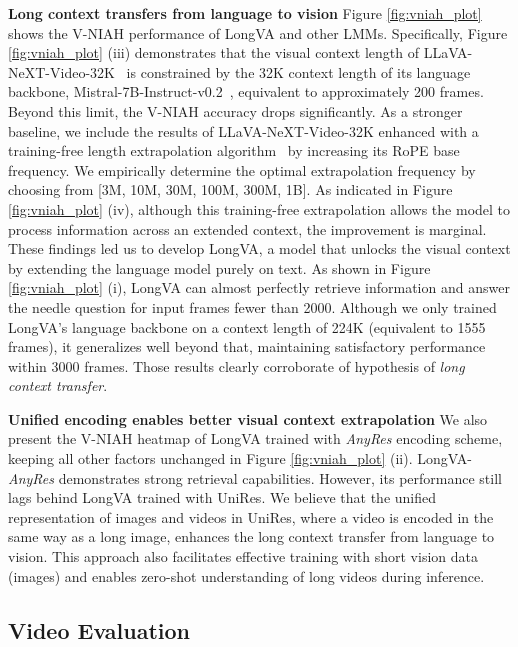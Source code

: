 \textbf{Long context transfers from language to vision} Figure \ref{fig:vniah_plot} shows the V-NIAH performance of LongVA and other LMMs. Specifically, Figure \ref{fig:vniah_plot} (iii) demonstrates that the visual context length of LLaVA-NeXT-Video-32K~\citep{zhang2024llavanextvideo} is constrained by the 32K context length of its language backbone, Mistral-7B-Instruct-v0.2~\citep{jiang2023mistral}, equivalent to approximately 200 frames. Beyond this limit, the V-NIAH accuracy drops significantly.  As a stronger baseline, we include the results of LLaVA-NeXT-Video-32K enhanced with a training-free length extrapolation algorithm~\citep{ntk_rope} by increasing its RoPE base frequency. We empirically determine the optimal extrapolation frequency by choosing from [3M, 10M, 30M, 100M, 300M, 1B]. As indicated in Figure \ref{fig:vniah_plot} (iv), although this training-free extrapolation allows the model to process information across an extended context, the improvement is marginal.  These findings led us to develop LongVA, a model that unlocks the visual context by extending the language model purely on text.  As shown in Figure \ref{fig:vniah_plot} (i), LongVA can almost perfectly retrieve information and answer the needle question for input frames fewer than 2000. Although we only trained LongVA's language backbone on a context length of 224K (equivalent to 1555 frames), it generalizes well beyond that, maintaining satisfactory performance within 3000 frames. Those results clearly corroborate of hypothesis of \textit{long context transfer}.

\textbf{Unified encoding enables better visual context extrapolation}
We also present the V-NIAH heatmap of LongVA trained with \textit{AnyRes} encoding scheme, keeping all other factors unchanged in Figure \ref{fig:vniah_plot} (ii). LongVA-\textit{AnyRes} demonstrates strong retrieval capabilities. However, its performance still lags behind LongVA trained with UniRes. We believe that the unified representation of images and videos in UniRes, where a video is encoded in the same way as a long image, enhances the long context transfer from language to vision. This approach also facilitates effective training with short vision data (images) and enables zero-shot understanding of long videos during inference.

\subsection{Video Evaluation}
\label{subsec:video_eval}

